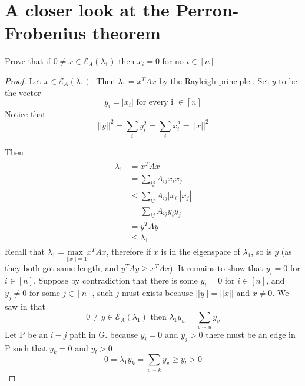 \documentclass[a4paper, 11pt, oneside]{article}
\newenvironment{problem}[1]
  {\renewcommand\theinnercustomprob{#1}\innercustomprob}
  {\endinnercustomprob}
\newcommand\abs[1]{\left|#1\right|}
\begin{document}
\section{A closer look at the Perron-Frobenius theorem}

\begin{problem}{4.1}\label{problem4.1}
Prove that if $0 \neq x \in \mathcal{E}_A(\lambda_1)$ then $x_i = 0$ for no  $i \in [n]$
\end{problem}

\begin{proof}
Let $x \in \mathcal{E}_A(\lambda_1)$. Then $\lambda_1 = x^TAx$ by the Rayleigh principle \cite{rayleigh}. Set $y$ to be the vector 
\begin{equation*}
y_i = \abs{x_i} \text{ for every i } \in [n]
\end{equation*}
Notice that
\begin{equation*}
\abs{\abs{y}}^2 = \sum_i y_i^2 = \sum_i x_i^2 = \abs{\abs{x}}^2 
\end{equation*}

Then
\begin{align*}
\begin{split}
\lambda_1 &=  x^TAx \\
				 &= \sum_{ij} A_{ij}x_ix_j\\
				 &\leq \sum_{ij} A_{ij}\abs{x_i}\abs{x_j}\\
				 &= \sum_{ij} A_{ij}y_iy_j\\
				 &=  y^TAy \\
				 &\leq \lambda_1
\end{split}
\end{align*}
Recall that $\lambda_1 = \underset{\abs{\abs{x}} = 1}{\text{max }} x^TAx$, therefore if $x$ is in the eigenspace of $\lambda_1$, so is $y$ (as they both got same length, and  $y^TAy \geq x^TAx$).
It remains to show that $y_i = 0$ for $i \in [n]$. Suppose by contradiction that there is some $y_i = 0$ for $i \in [n]$,
and $y_j \neq 0$ for some $j \in [n]$, such $j$ must exists because $\abs{\abs{y}} = \abs{\abs{x}} \text{ and }x \neq 0$.
We saw in \cite{adjacency_matrix} that
\begin{equation*}
0 \neq y \in \mathcal{E}_A(\lambda_1) \text{ then } \lambda_1 y_u = \sum_{v\sim u} y_v
\end{equation*}
Let P be an $i-j$ path in G. because $y_i = 0$ and $y_j > 0$ there must be an edge in P such that $y_k = 0$ and $y_l > 0$
\begin{equation*}
0 = \lambda_1 y_k = \sum_{v\sim k} y_v \geq y_l > 0
\end{equation*}
\end{proof}
\end{document}
